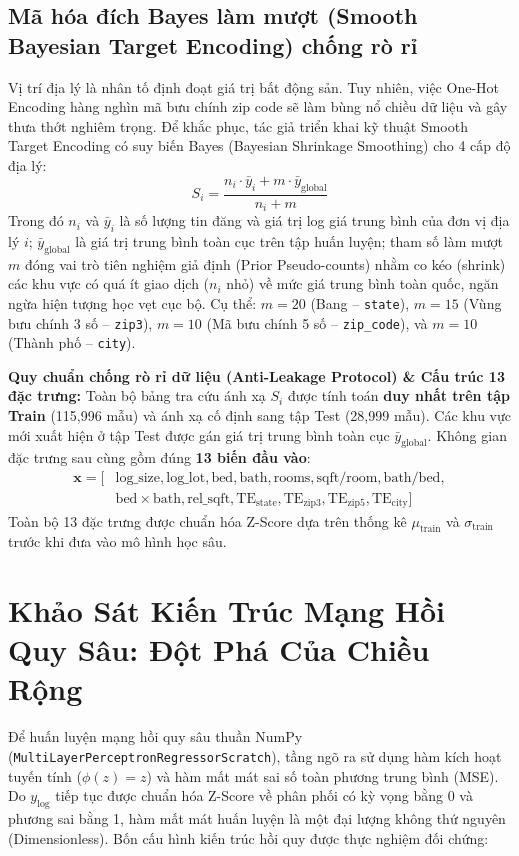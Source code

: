 \documentclass[12pt,a4paper]{report}
\begin{document}
\subsection{Mã hóa đích Bayes làm mượt (Smooth Bayesian Target Encoding) chống rò rỉ}
Vị trí địa lý là nhân tố định đoạt giá trị bất động sản. Tuy nhiên, việc One-Hot Encoding hàng nghìn mã bưu chính zip code sẽ làm bùng nổ chiều dữ liệu và gây thưa thớt nghiêm trọng. Để khắc phục, tác giả triển khai kỹ thuật Smooth Target Encoding có suy biến Bayes (Bayesian Shrinkage Smoothing) cho 4 cấp độ địa lý:
\begin{equation}
    S_i = \frac{n_i \cdot \bar{y}_i + m \cdot \bar{y}_{\text{global}}}{n_i + m}
\end{equation}
Trong đó $n_i$ và $\bar{y}_i$ là số lượng tin đăng và giá trị log giá trung bình của đơn vị địa lý $i$; $\bar{y}_{\text{global}}$ là giá trị trung bình toàn cục trên tập huấn luyện; tham số làm mượt $m$ đóng vai trò tiên nghiệm giả định (Prior Pseudo-counts) nhằm co kéo (shrink) các khu vực có quá ít giao dịch ($n_i$ nhỏ) về mức giá trung bình toàn quốc, ngăn ngừa hiện tượng học vẹt cục bộ. Cụ thể: $m = 20$ (Bang -- \texttt{state}), $m = 15$ (Vùng bưu chính 3 số -- \texttt{zip3}), $m = 10$ (Mã bưu chính 5 số -- \texttt{zip\_code}), và $m = 10$ (Thành phố -- \texttt{city}).

\textbf{Quy chuẩn chống rò rỉ dữ liệu (Anti-Leakage Protocol) \& Cấu trúc 13 đặc trưng:}
Toàn bộ bảng tra cứu ánh xạ $S_i$ được tính toán \textbf{duy nhất trên tập Train} (115,996 mẫu) và ánh xạ cố định sang tập Test (28,999 mẫu). Các khu vực mới xuất hiện ở tập Test được gán giá trị trung bình toàn cục $\bar{y}_{\text{global}}$. Không gian đặc trưng sau cùng gồm đúng \textbf{13 biến đầu vào}:
\begin{equation}
\begin{split}
    \mathbf{x} = \big[ & \text{log\_size}, \text{log\_lot}, \text{bed}, \text{bath}, \text{rooms}, \text{sqft/room}, \text{bath/bed}, \\
    & \text{bed}\times\text{bath}, \text{rel\_sqft}, \text{TE}_{\text{state}}, \text{TE}_{\text{zip3}}, \text{TE}_{\text{zip5}}, \text{TE}_{\text{city}} \big]
\end{split}
\end{equation}
Toàn bộ 13 đặc trưng được chuẩn hóa Z-Score dựa trên thống kê $\mu_{\text{train}}$ và $\sigma_{\text{train}}$ trước khi đưa vào mô hình học sâu.

\section{Khảo Sát Kiến Trúc Mạng Hồi Quy Sâu: Đột Phá Của Chiều Rộng}
Để huấn luyện mạng hồi quy sâu thuần NumPy (\texttt{MultiLayerPerceptronRegressorScratch}), tầng ngõ ra sử dụng hàm kích hoạt tuyến tính ($\phi(z) = z$) và hàm mất mát sai số toàn phương trung bình (MSE). Do $y_{\text{log}}$ tiếp tục được chuẩn hóa Z-Score về phân phối có kỳ vọng bằng 0 và phương sai bằng 1, hàm mất mát huấn luyện là một đại lượng không thứ nguyên (Dimensionless). Bốn cấu hình kiến trúc hồi quy được thực nghiệm đối chứng:
\end{document}
